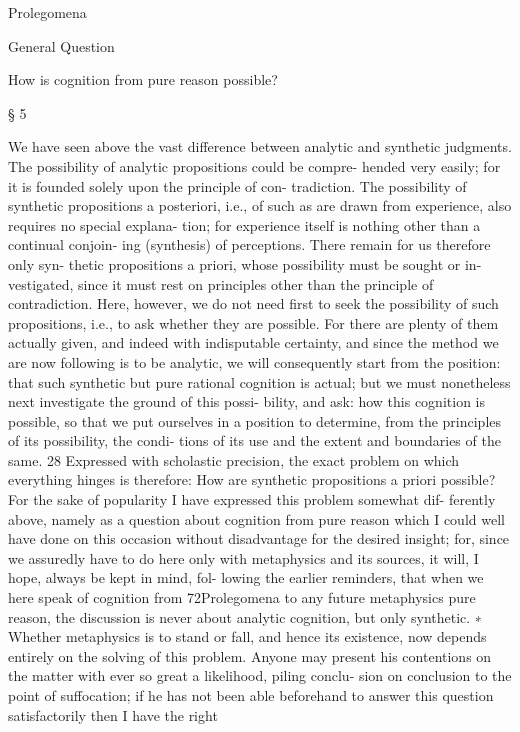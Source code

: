 Prolegomena

General Question

How is cognition from pure reason possible?

§ 5

We have seen above the vast difference between analytic and synthetic
judgments. The possibility of analytic propositions could be compre-
hended very easily; for it is founded solely upon the principle of con-
tradiction. The possibility of synthetic propositions a posteriori, i.e., of
such as are drawn from experience, also requires no special explana-
tion; for experience itself is nothing other than a continual conjoin-
ing (synthesis) of perceptions. There remain for us therefore only syn-
thetic propositions a priori, whose possibility must be sought or in-
vestigated, since it must rest on principles other than the principle of
contradiction.
Here, however, we do not need ﬁrst to seek the possibility of such
propositions, i.e., to ask whether they are possible. For there are plenty
of them actually given, and indeed with indisputable certainty, and since
the method we are now following is to be analytic, we will consequently
start from the position: that such synthetic but pure rational cognition is
actual; but we must nonetheless next investigate the ground of this possi-
bility, and ask: how this cognition is possible, so that we put ourselves in
a position to determine, from the principles of its possibility, the condi-
tions of its use and the extent and boundaries of the same. 28 Expressed
with scholastic precision, the exact problem on which everything hinges
is therefore:
How are synthetic propositions a priori possible?
For the sake of popularity I have expressed this problem somewhat dif-
ferently above, namely as a question about cognition from pure reason
which I could well have done on this occasion without disadvantage for
the desired insight; for, since we assuredly have to do here only with
metaphysics and its sources, it will, I hope, always be kept in mind, fol-
lowing the earlier reminders, that when we here speak of cognition from
72Prolegomena to any future metaphysics
pure reason, the discussion is never about analytic cognition, but only
synthetic. ∗
Whether metaphysics is to stand or fall, and hence its existence, now
depends entirely on the solving of this problem. Anyone may present his
contentions on the matter with ever so great a likelihood, piling conclu-
sion on conclusion to the point of suffocation; if he has not been able
beforehand to answer this question satisfactorily then I have the right
